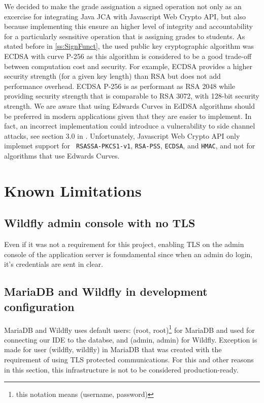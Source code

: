 We decided to make the grade assignation a signed operation not only as an excercise for integrating Java JCA with Javascript Web Crypto API, but also because implementing this ensure an higher level of integrity and accountability for a particularly sesnsitive operation that is assigning grades to students. As stated before in \autoref{ss:SignFunct}, the used public key cryptographic algorithm was ECDSA with curve P-256 as this algorithm is considered to be a good trade-off between computation cost and security. For example, ECDSA provides a higher security strength (for a given key length) than RSA but does not add performance overhead. ECDSA P-256 is as performant as RSA 2048 while providing security strength that is comparable to RSA 3072, with 128-bit security strength\cite{online:AWS}. We are aware that using Edwards Curves in EdDSA algorithms should be preferred in modern applications given that they are easier to implement. In fact, an incorrect implementation could introduce a vulnerability to side channel attacks, see section 3.0 in \cite{Adalier2015EfficientAS}. Unfortunately, Javascript Web Crypto API only implemet support for \texttt{ RSASSA-PKCS1-v1}, \texttt{RSA-PSS}, \texttt{ECDSA}, and \texttt{HMAC}, and not for algorithms that use Edwards Curves.

\newpage
\chapter{Known Limitations}

\section{Wildfly admin console with no TLS}

Even if it was not a requirement for this project, enabling TLS on the admin console of the application server is foundamental since when an admin do login, it's credentials are sent in clear. 

\section{MariaDB and Wildfly in development configuration}

MariaDB and Wildfly uses default users: (root, root)\footnote{this notation means (username, password)} for MariaDB and used for connecting our IDE to the databse, and (admin, admin) for Wildfly. Exception is made for user (wildfly, wildfly) in MariaDB that was created with the requirement of using TLS protected communications. For this and other reasons in this section, this infrastructure is not to be considered production-ready.

